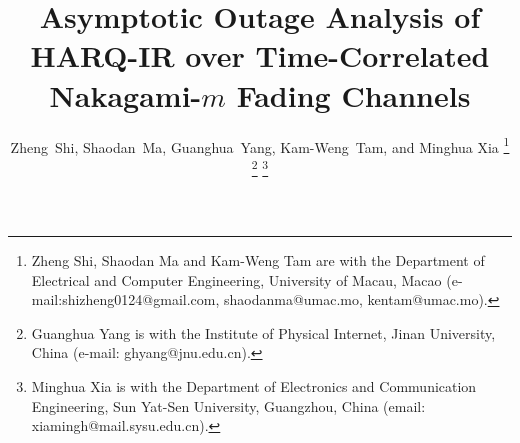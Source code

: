 \documentclass[12pt,onecolumn,draftcls]{IEEEtran}
\begin{document}
\title{Asymptotic Outage Analysis of HARQ-IR over Time-Correlated Nakagami-$m$ Fading Channels}
\author{Zheng~Shi,
        Shaodan~Ma, Guanghua~Yang, Kam-Weng~Tam, and Minghua Xia
\thanks{Zheng Shi, Shaodan Ma and Kam-Weng Tam are with the Department of Electrical and Computer Engineering, University of Macau, Macao (e-mail:shizheng0124@gmail.com, shaodanma@umac.mo, kentam@umac.mo).}
\thanks{Guanghua Yang is with the Institute of Physical Internet, Jinan University, China (e-mail: ghyang@jnu.edu.cn).}
\thanks{Minghua Xia is with the Department of Electronics and Communication Engineering, Sun Yat-Sen University, Guangzhou, China (email: xiamingh@mail.sysu.edu.cn).}
}
\maketitle
\end{document}
